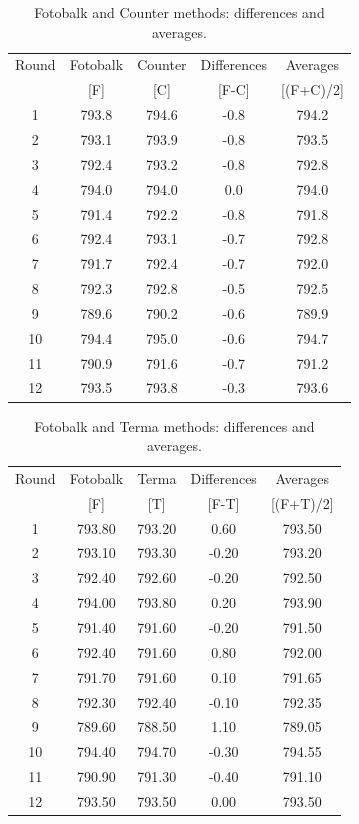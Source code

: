 \documentclass[12pt, a4paper]{report}
\begin{document}
\begin{table}[h!]
\renewcommand\arraystretch{0.7}%
\begin{center}
\begin{tabular}{|c||c|c||c|c|}
  \hline
 Round & Fotobalk  & Counter  & Differences  & Averages  \\
  &  [F] & [C] & [F-C] &  [(F+C)/2] \\
  \hline
1 & 793.8 & 794.6 & -0.8 & 794.2 \\
  2 & 793.1 & 793.9 & -0.8 & 793.5 \\
  3 & 792.4 & 793.2 & -0.8 & 792.8 \\
  4 & 794.0 & 794.0 & 0.0 & 794.0 \\
  5 & 791.4 & 792.2 & -0.8 & 791.8 \\
  6 & 792.4 & 793.1 & -0.7 & 792.8 \\
  7 & 791.7 & 792.4 & -0.7 & 792.0 \\
  8 & 792.3 & 792.8 & -0.5 & 792.5 \\
  9 & 789.6 & 790.2 & -0.6 & 789.9 \\
  10 & 794.4 & 795.0 & -0.6 & 794.7 \\
  11 & 790.9 & 791.6 & -0.7 & 791.2 \\
  12 & 793.5 & 793.8 & -0.3 & 793.6 \\
   \hline
\end{tabular}
\caption{Fotobalk and Counter methods: differences and averages.}
\end{center}
\end{table}

\begin{table}[h!]
\renewcommand\arraystretch{0.7}%
\begin{center}
\begin{tabular}{|c||c|c||c|c|}
  \hline
 Round & Fotobalk  & Terma  & Differences  & Averages  \\
  &  [F] & [T] & [F-T] &  [(F+T)/2] \\
  \hline
1 & 793.80 & 793.20 & 0.60 & 793.50 \\
  2 & 793.10 & 793.30 & -0.20 & 793.20 \\
  3 & 792.40 & 792.60 & -0.20 & 792.50 \\
  4 & 794.00 & 793.80 & 0.20 & 793.90 \\
  5 & 791.40 & 791.60 & -0.20 & 791.50 \\
  6 & 792.40 & 791.60 & 0.80 & 792.00 \\
  7 & 791.70 & 791.60 & 0.10 & 791.65 \\
  8 & 792.30 & 792.40 & -0.10 & 792.35 \\
  9 & 789.60 & 788.50 & 1.10 & 789.05 \\
  10 & 794.40 & 794.70 & -0.30 & 794.55 \\
  11 & 790.90 & 791.30 & -0.40 & 791.10 \\
  12 & 793.50 & 793.50 & 0.00 & 793.50 \\

   \hline
\end{tabular}
\caption{Fotobalk and Terma methods: differences and averages.}
\end{center}
\end{table}
\end{document}

